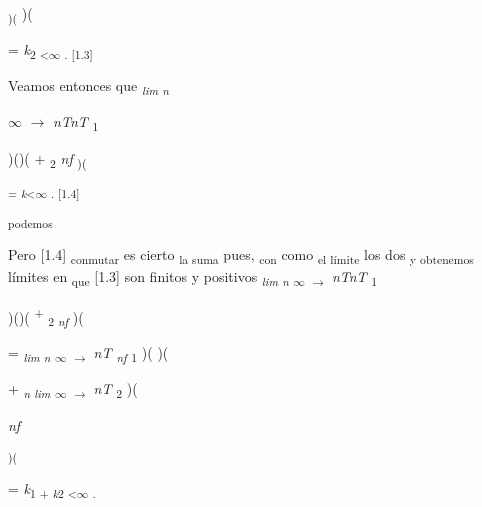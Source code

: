 \documentclass[12pt]{article}
\renewcommand{\_}{\kern-1.5pt\textunderscore\kern-1.5pt}
\begin{document}
\textsubscript{)( })( {\fontsize{10pt}{12.0pt}\selectfont = \textit{k}\textsubscript{2 <$\infty$ . [1.3] }\par}\par

{\fontsize{10pt}{12.0pt}\selectfont Veamos entonces que \textit{\textsubscript{lim n }}\par}\par

{\fontsize{6pt}{7.2pt}\selectfont $\infty$ $ \rightarrow $  \textit{nTnT }\textsubscript{1 }\par}\par

\begin{Center}
)()( + \textsubscript{2 }\textit{nf }\textsubscript{)( }
\end{Center}\par

\textsuperscript{= \textit{k}<$\infty$ . [1.4] }\par

\textsubscript{podemos }{\fontsize{10pt}{12.0pt}\selectfont Pero [1.4] \textsubscript{conmutar }es cierto \textsubscript{la suma }pues, \textsubscript{con }como \textsubscript{el límite }los dos \textsubscript{y obtenemos }límites en \textsubscript{que }[1.3] son finitos y positivos \textit{\textsubscript{lim n }}\textsubscript{$\infty$ $ \rightarrow $  }\textit{nTnT }\textsubscript{1 }\par}\par

\begin{Center}
)()( \textsuperscript{+ }\textsubscript{2 \textit{nf }})( 
\end{Center}\par

= \textit{\textsubscript{lim n }}\textsubscript{$\infty$ $ \rightarrow $  }\textit{nT \textsubscript{nf }}\textsubscript{1 })( )( \par

+ \textit{\textsubscript{n lim }}\textsubscript{$\infty$ $ \rightarrow $  }\textit{nT }\textsubscript{2 })( \par

\textit{nf }\par

\textsubscript{)( }\par

{\fontsize{10pt}{12.0pt}\selectfont = \textit{k}\textsubscript{1 + \textit{k}2 <$\infty$ . }\par}\par
\end{document}
